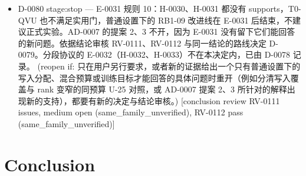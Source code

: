 \documentclass[11pt]{article}
\begin{document}
\begin{itemize}
分不开，这在 E-0021、E-0028 中已经反复出现；gold-answer NLL 与准确率的排序不一致（本次 RB1-07 准确率最高，NLL 1.549 却最高；RB1-01 的 NLL 1.497 最低，准确率比 RB1-07 低 0.84 pp），在 E-0028 就已观测到（X-01 1.5496 对 LoRA 1.5573），正是提案 3 原本的动机，不是 E-0031 新出现的问题。D-0076 下分段协议的 E-0032（H-0032@2、H-0033@3）不受本结论影响，由 RV-0110 另行审核。H-0021 维持 D-0066 的暂停；E-0028 规则 10 对 tap 与来源继续有效；H-0014 在原配置下的 challenged 与 D-0042 不变。E-0031 实测共 1.045 node\ensuremath{\cdot}h（含全部失败与重复；初始上限 1.3，总上限 2.0）。 阶段交付（stop）：实现已就绪（q、v、up 写入路径、同参数 T0、零训练复评与锁定分析都经审核；新 arm 的训练、干预与 RB1-01、RB1-07、RB1-09 的复评在 2g 上，RB1-02 按其训练规格在 1g 上复评；成本实测）；证据范围是单 seed 的 screening，按预登记规则为 inconclusive，不宣称实用价值。重开条件：用户另行要求；或者新的证据给出一个只有普通设置下的写入分配、混合预算或训练目标才能回答的具体问题，并有新的决定与结论审核。 (reopen if: 只在用户另行要求，或者新的证据给出一个只有普通设置下的写入分配、混合预算或训练目标才能回答的具体问题时重开（例如分清写入覆盖与 rank 变窄的同预算 U-25 对照，或 AD-0007 提案 2、3 所针对的解释出现新的支持），都要有新的决定与结论审核。) [conclusion review RV-0111 issues, medium open (same\_family\_unverified), RV-0112 pass (same\_family\_unverified)]
\item D-0080 stage:stop --- E-0031 规则 10：H-0030、H-0031 都没有 supports，T0-QVU 也不满足实用门，普通设置下的 RB1-09 改进线在 E-0031 后结束，不建议正式实验。AD-0007 的提案 2、3 不开，因为 E-0031 没有留下它们能回答的新问题。依据结论审核 RV-0111、RV-0112 与同一结论的路线决定 D-0079。分段协议的 E-0032（H-0032、H-0033）不在本决定内，已由 D-0078 记录。 (reopen if: 只在用户另行要求，或者新的证据给出一个只有普通设置下的写入分配、混合预算或训练目标才能回答的具体问题时重开（例如分清写入覆盖与 rank 变窄的同预算 U-25 对照，或 AD-0007 提案 2、3 所针对的解释出现新的支持），都要有新的决定与结论审核。) [conclusion review RV-0111 issues, medium open (same\_family\_unverified), RV-0112 pass (same\_family\_unverified)]
\end{itemize}

\section{Conclusion}
\end{document}
